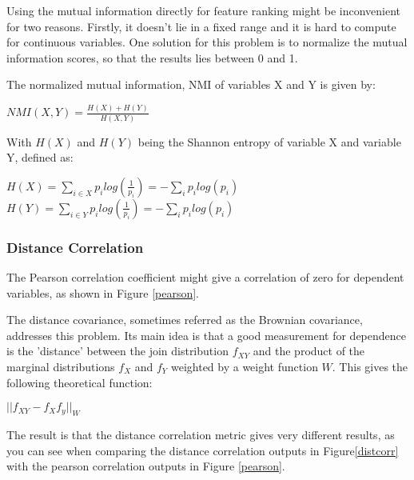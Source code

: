 \npar

Using the mutual information directly for feature ranking might be inconvenient for two reasons. Firstly, it doesn't lie in a fixed range and it is hard to compute for continuous variables. One solution for this problem is to normalize the mutual information scores, so that the results lies between 0 and 1.

The normalized mutual information, NMI of variables X and Y is given by:
\begin{center}
$NMI(X,Y) = \frac{H(X) + H(Y)}{H(X,Y)}$
\end{center}
With $H(X)$ and $H(Y)$ being the Shannon entropy of variable X and variable Y, defined as:
\begin{center}
$H(X) = \sum\limits_{i\in X} p_ilog(\frac{1}{p_i}) = - \sum\limits_i p_ilog(p_i)$\\
$H(Y) = \sum\limits_{i\in Y} p_ilog(\frac{1}{p_i}) = - \sum\limits_i p_ilog(p_i)$
\end{center}
\npar

\subsubsection{Distance Correlation}
The Pearson correlation coefficient might give a correlation of zero for dependent variables, as shown in Figure \ref{pearson}.



The distance covariance, sometimes referred as the Brownian covariance, addresses this problem\citep{distPaper}. Its main idea is that a good measurement for dependence is the 'distance' between the join distribution $f_{XY}$ and the product of the marginal distributions $f_X$ and $f_Y$ weighted by a weight function $W$. This gives the following theoretical function:

\begin{center}
$|| f_{XY} - f_Xf_y||_W$
\end{center}

The result is that the distance correlation metric gives very different results, as you can see when comparing the distance correlation outputs in Figure\ref{distcorr} with the pearson correlation outputs in Figure \ref{pearson}.



